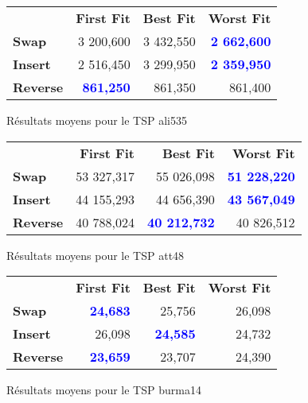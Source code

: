 \documentclass[a4paper,10pt]{report}
\begin{document}
\begin{center}
  \begin{figure}[h]
    \begin{tabular}{l|r|r|r}
      &		\textbf{First Fit}&	\textbf{Best Fit}&	\textbf{Worst Fit}\\
      \textbf{Swap}&
	  3 200,600&
	  3 432,550&
	  \textbf{\textcolor{blue}{2 662,600}}\\
      \textbf{Insert}&
	  2 516,450&
	  3 299,950&
	  \textbf{\textcolor{blue}{2 359,950}}\\
      \textbf{Reverse}&
	  \textbf{\textcolor{blue}{861,250}}&
	  861,350&
	  861,400\\
    \end{tabular}
    \label{ali535-results}
    \caption{Résultats moyens pour le TSP ali535}
  \end{figure}
\end{center}

\begin{center}
  \begin{figure}[h]
    \begin{tabular}{l|r|r|r}
      &		\textbf{First Fit}&	\textbf{Best Fit}&	\textbf{Worst Fit}\\
      \textbf{Swap}&
	  53 327,317&
	  55 026,098&
	  \textbf{\textcolor{blue}{51 228,220}}\\
      \textbf{Insert}&
	  44 155,293&
	  44 656,390&
	  \textbf{\textcolor{blue}{43 567,049}}\\
      \textbf{Reverse}&
	  40 788,024&
	  \textbf{\textcolor{blue}{40 212,732}}&
	  40 826,512\\
    \end{tabular}
    \label{att48-results}
    \caption{Résultats moyens pour le TSP att48}
  \end{figure}
\end{center}

\begin{center}
  \begin{figure}[h]
    \begin{tabular}{l|r|r|r}
      &		\textbf{First Fit}&	\textbf{Best Fit}&	\textbf{Worst Fit}\\
      \textbf{Swap}&
	  \textbf{\textcolor{blue}{24,683}}&
	  25,756&
	  26,098\\
      \textbf{Insert}&
	  26,098&
	  \textbf{\textcolor{blue}{24,585}}&
	  24,732\\
      \textbf{Reverse}&
	  \textbf{\textcolor{blue}{23,659}}&
	  23,707&
	  24,390\\
    \end{tabular}
    \label{burma14-results}
    \caption{Résultats moyens pour le TSP burma14}
  \end{figure}
\end{center}
\end{document}
